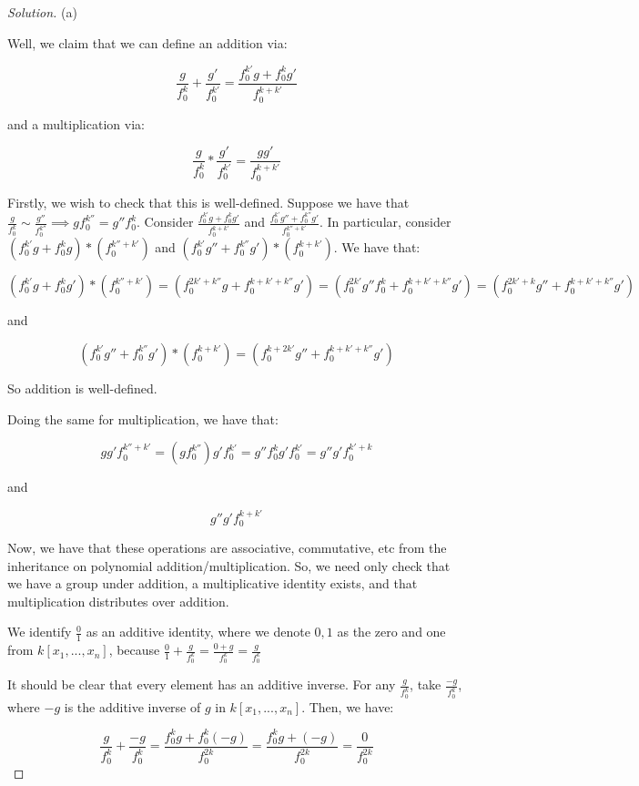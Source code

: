\documentclass[10pt]{article}
\begin{document}
\begin{proof}[Solution]
(a)

Well, we claim that we can define an addition via:

$$ \frac{g}{f_0^k} + \frac{g'}{f_0^{k'}} = \frac{f_0^{k'} g + f_0^k g'}{f_0^{k + k'}}$$

and a multiplication via:

$$  \frac{g}{f_0^k} * \frac{g'}{f_0^{k'}} = \frac{gg'}{f_0^{k + k'}} $$

Firstly, we wish to check that this is well-defined. Suppose we have that $ \frac{g}{f_0^k} \sim \frac{g''}{f_0^{k''}} \implies gf_0^{k''} = g'' f_0^k$. Consider $\frac{f_0^{k'} g + f_0^k g'}{f_0^{k + k'}}$ and $\frac{f_0^{k'} g'' + f_0^{k''} g'}{f_0^{k'' + k'}}$. In particular, consider $(f_0^{k'} g + f_0^k g) * (f_0^{k'' + k'})$ and  $(f_0^{k'} g'' + f_0^{k''} g') * (f_0^{k + k'})$. We have that:

$$(f_0^{k'} g + f_0^k g') * (f_0^{k'' + k'}) = (f_0^{2k' + k''}g + f_0^{k + k' + k''} g') = (f_0^{2k'}g''f_0^k + f_0^{k + k' + k''} g') =  (f_0^{2k' + k}g'' + f_0^{k + k' + k''} g') $$

and

$$ (f_0^{k'} g'' + f_0^{k''} g') * (f_0^{k + k'}) = (f_0^{k + 2k'} g'' + f_0^{k + k' + k''} g') $$

So addition is well-defined.

Doing the same for multiplication, we have that:

$$ gg'f_0^{k'' + k'} = (gf_0^{k''}) g' f_0^{k'} = g'' f_0^k g' f_0^{k'} = g'' g'f_0^{k' + k} $$

and

$$ g''g'f_0^{k + k'} $$

Now, we have that these operations are associative, commutative, etc from the inheritance on polynomial addition/multiplication. So, we need only check that we have a group under addition, a multiplicative identity exists, and that multiplication distributes over addition.

We identify $\frac{0}{1}$ as an additive identity, where we denote $0,1$ as the zero and one from $k[x_1,...,x_n]$, because $\frac{0}{1} + \frac{g}{f_0^k} = \frac{0 + g}{f_0^k} = \frac{g}{f_0^k}$

It should be clear that every element has an additive inverse. For any $\frac{g}{f_0^k}$, take $\frac{-g}{f_0^k}$, where $-g$ is the additive inverse of $g$ in $k[x_1,...,x_n]$. Then, we have:

$$ \frac{g}{f_0^k} + \frac{-g}{f_0^k} = \frac{f_0^kg + f_0^k (-g)}{f_0^{2k}} = \frac{f_0^kg + (-g)}{f_0^{2k}} = \frac{0}{f_0^{2k}} $$


\end{proof}
\end{document}
